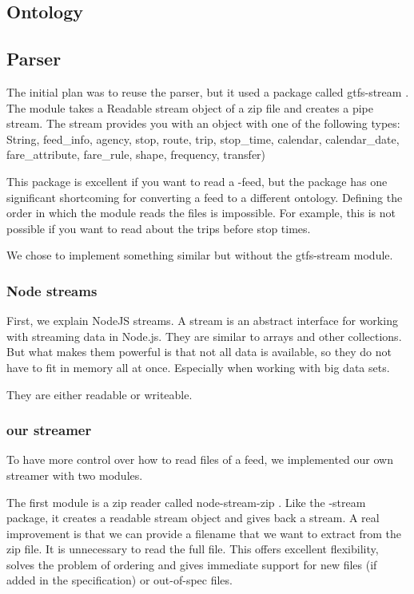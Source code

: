 \subsection{Ontology}

\subsection{Parser}
The initial plan was to reuse the parser, but it used a package called gtfs-stream \cite{noauthor_staecogtfs-stream_2024}. The module takes a Readable stream object of a  zip file and creates a pipe stream. The stream provides you  with an object with one of the following types: String, feed\_info, agency, stop, route, trip, stop\_time, calendar, calendar\_date, fare\_attribute, fare\_rule, shape, frequency, transfer)

This package is excellent if you want to read a -feed, but the package has one significant shortcoming for converting a feed to a different ontology. Defining the order in which the module reads the files is impossible. For example, this is not possible if you want to read about the trips before stop times.

We chose to implement something similar but without the gtfs-stream module. 
\subsubsection{Node streams}
First, we explain NodeJS streams. A stream is an abstract interface for working with streaming data in Node.js. \cite{noauthor_stream_nodate} They are similar to arrays and other collections. But what makes them powerful is that not all data is available, so they do not have to fit in memory all at once. Especially when working with big data sets.

They are either readable or writeable.

\subsubsection{our  streamer}
To have more control over how to read files of a  feed, we implemented our own  streamer with two modules.



The first module is a zip reader called node-stream-zip \cite{noauthor_node-stream-zip_2021}. Like the -stream package, it creates a readable stream object and gives back a stream. A real improvement is that we can provide a filename that we want to extract from the zip file. It is unnecessary to read the full  file. This offers excellent flexibility, solves the problem of ordering and gives immediate support for new files (if added in the  specification) or out-of-spec files.

